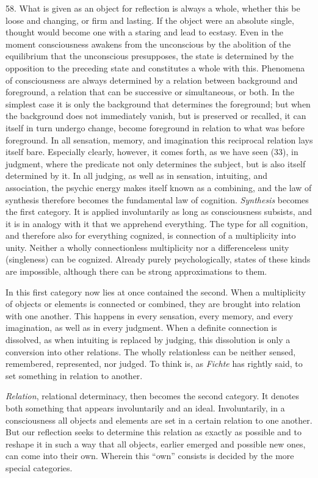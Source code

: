 \documentclass[12pt,a4paper]{book}
\newcommand{\opage}[1]{\marginnote{\footnotesize\textit{[#1]}}}
\begin{document}
58. What is given as an object for reflection is always a whole, whether
this be loose and changing, or firm and lasting. If the object were an
absolute single, thought would become one with a staring and lead to
ecstasy. Even in the moment \opage{155}consciousness awakens from the unconscious by
the abolition of the equilibrium that the unconscious presupposes, the
state is determined by the opposition to the preceding state and constitutes
a whole with this. Phenomena of consciousness are always determined by a
relation between background and foreground, a relation that can be
successive or simultaneous, or both. In the simplest case it is only the
background that determines the foreground; but when the background does not
immediately vanish, but is preserved or recalled, it can itself in turn
undergo change, become foreground in relation to what was before
foreground. In all sensation, memory, and imagination this reciprocal
relation lays itself bare. Especially clearly, however, it comes forth, as
we have seen (33), in judgment, where the predicate not only determines the
subject, but is also itself determined by it. In all judging, as well as in
sensation, intuiting, and association, the psychic energy makes itself known
as a combining, and the law of synthesis therefore becomes the fundamental
law of cognition. \emph{Synthesis} becomes the first category. It is applied
involuntarily as long as consciousness subsists, and it is in analogy with
it that we apprehend everything. The type for all cognition, and therefore
also for everything cognized, is connection of a multiplicity into unity.
Neither a wholly connectionless multiplicity nor a differenceless unity
(singleness) can be cognized. Already purely psychologically, states of
these kinds are impossible, although there can be strong approximations to
them.

In this first category now lies at once contained the second. When a
multiplicity of objects or elements is connected or combined, they are
brought into relation with one another. This happens in every sensation,
every memory, and every imagination, as well as in every judgment. When a
definite connection is dissolved, as when intuiting is replaced by judging,
this dissolution is only a conversion into other relations. The wholly
relationless can be neither sensed, remembered, represented, nor judged. To
think is, as \emph{Fichte} has rightly said, to set something in relation to
another.

\emph{Relation}, relational determinacy, then becomes the second \opage{156}category.
It denotes both something that appears involuntarily and an ideal.
Involuntarily, in a consciousness all objects and elements are set in a
certain relation to one another. But our reflection seeks to determine this
relation as exactly as possible and to reshape it in such a way that all
objects, earlier emerged and possible new ones, can come into their own.
Wherein this ``own'' consists is decided by the more special categories.
\end{document}
